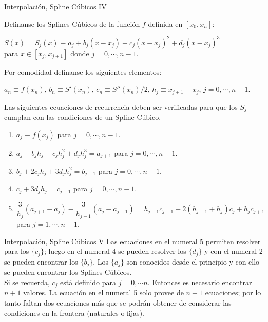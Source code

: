 \begin{frame}{Interpolación, Spline Cúbicos IV}
\begin{Def}
\small
\indent Definanse los Splines Cúbicos de la función $f$ definida en $[x_0,x_n]$:
\begin{center}
$S(x)=S_j(x)\equiv a_j+b_j(x-x_j)+c_j(x-x_j)^2+d_j(x-x_j)^3$\\ para $x\in[x_j,x_{j+1}]$ donde $j=0,\cdots, n-1$.
\end{center}
\indent Por comodidad definanse los siguientes elementos:
\begin{center}
$a_n\equiv f(x_n)$, $b_n\equiv S'(x_n)$, $c_n\equiv S''(x_n)/2$, $h_j\equiv x_{j+1}-x_j$, $j=0,\cdots, n-1$.
\end{center}
\indent Las siguientes ecuaciones de recurrencia deben ser verificadas para que los $S_j$ cumplan con las condiciones de un Spline Cúbico.
\begin{enumerate}
\item $a_j\equiv f(x_j)$ para $j=0,\cdots, n-1$.
\item $a_j+b_jh_j+c_jh_j^2+d_jh_j^3=a_{j+1}$ para $j=0,\cdots, n-1$.
\item $b_j+2c_jh_j+3d_jh_j^2=b_{j+1}$ para $j=0,\cdots, n-1$.
\item $c_j+3d_jh_j=c_{j+1}$ para $j=0,\cdots, n-1$.
\item $\dfrac{3}{h_j}(a_{j+1}-a_j)-\dfrac{3}{h_{j-1}}(a_j-a_{j-1})=h_{j-1}c_{j-1}+2(h_{j-1}+h_j)c_j+h_jc_{j+1}$ para $j=1,\cdots, n-1$.
\end{enumerate}
\end{Def}
\end{frame}
\begin{frame}{Interpolación, Spline Cúbicos V}
\indent Las ecuaciones en el numeral 5 permiten resolver para los $\{c_j\}$; luego en el numeral 4 se pueden resolver los $\{d_j\}$ y con el numeral 2 se pueden encontrar los $\{b_j\}$. Los $\{a_j\}$ son conocidos desde el principio y con ello se pueden encontrar los Splines Cúbicos. \\
\indent Si se recuerda, $c_j$ está definido para $j=0,\cdots n$. Entonces es necesario encontrar $n+1$ valores. La ecuación en el numeral 5 solo provee de $n-1$ ecuaciones; por lo tanto faltan dos ecuaciones más que se podrán obtener de considerar las condiciones en la frontera (naturales o fijas). 
\end{frame}
